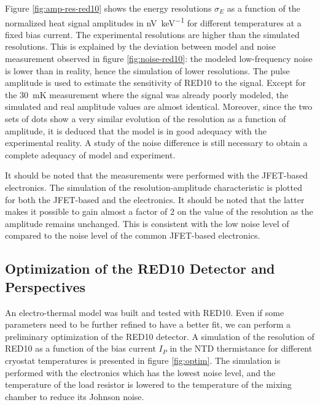 Figure \ref{fig:amp-res-red10} shows the energy resolutions $\sigma_E$ as a function of the normalized heat signal amplitudes in \si{\nano\volt\per\kilo\eV} for different temperatures at a fixed bias current. The experimental resolutions are higher than the simulated resolutions. This is explained by the deviation between model and noise measurement observed in figure \ref{fig:noise-red10}: the modeled low-frequency noise is lower than in reality, hence the simulation of lower resolutions. The pulse amplitude is used to estimate the sensitivity of RED10 to the signal. Except for the \SI{30}{\milli\kelvin} measurement where the signal was already poorly modeled, the simulated and real amplitude values are almost identical. Moreover, since the two sets of dots show a very similar evolution of the resolution as a function of amplitude, it is deduced that the model is in good adequacy with the experimental reality. A study of the noise difference is still necessary to obtain a complete adequacy of model and experiment.

It should be noted that the measurements were performed with the JFET-based electronics. The simulation of the resolution-amplitude characteristic is plotted for both the JFET-based and the \Edelweiss{} electronics. It should be noted that the latter makes it possible to gain almost a factor of 2 on the value of the resolution as the amplitude remains unchanged. This is consistent with the low noise level of \Edelweiss{} compared to the noise level of the common JFET-based electronics.


\subsection{Optimization of the RED10 Detector and Perspectives}

An electro-thermal model was built and tested with RED10. Even if some parameters need to be further refined to have a better fit, we can perform a preliminary optimization of the RED10 detector. A simulation of the resolution of RED10 as a function of the bias current $I_P$ in the NTD thermistance for different cryostat temperatures is presented in figure \ref{fig:optim}. The simulation is performed with the \Edelweiss{} electronics which has the lowest noise level, and the temperature of the load resistor is lowered to the temperature of the mixing chamber to reduce its Johnson noise.


